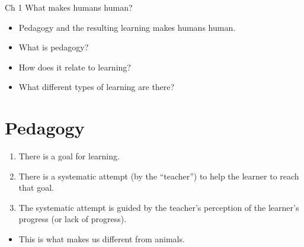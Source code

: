\begin{frame}
  \begin{block}{Ch 1 What makes humans human?}
    \begin{itemize}
      \item Pedagogy and the resulting learning makes humans human.
      \item What is pedagogy?
      \item How does it relate to learning?
      \item What different types of learning are there?
    \end{itemize}
  \end{block}
\end{frame}


\section{Pedagogy}

\begin{frame}
  \begin{definition}
    \begin{enumerate}
      \item There is a goal for learning.
      \item There is a systematic attempt (by the \enquote{teacher}) to help 
        the learner to reach that goal.
      \item The systematic attempt is guided by the teacher's perception of the 
        learner's progress (or lack of progress).
    \end{enumerate}
  \end{definition}

  \pause

  \begin{remark}
    \begin{itemize}
      \item This is what makes us different from animals.
    \end{itemize}
  \end{remark}
\end{frame}


